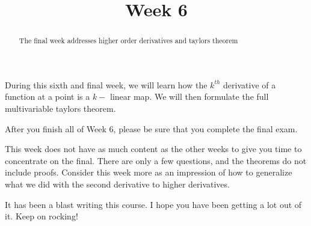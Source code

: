 \documentclass{ximera}
\title{Week 6}
\begin{document}
\begin{abstract}
  The final week addresses higher order derivatives and taylors theorem
\end{abstract}

During this sixth and final week, we will learn how the $k^{th}$ derivative of a function at
a point is a $k-$ linear map.  We will then formulate the full multivariable taylors theorem.

After you finish all of Week 6, please be sure that you complete the
final exam.

This week does not have as much content as the other weeks to give you time to concentrate on the final.  There are only a few questions,
and the theorems do not include proofs.  Consider this week more as an impression of how to generalize what we did with the second derivative
to higher derivatives.

It has been a blast writing this course.  I hope you have been getting a lot out of it.  Keep on rocking!
\end{document}
